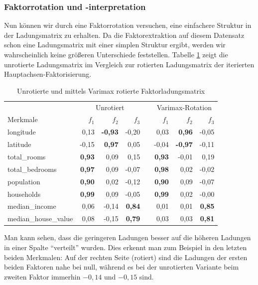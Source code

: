 \documentclass[11pt]{scrartcl}
\begin{document}
	\subsubsection*{Faktorrotation und -interpretation}
	
	Nun können wir durch eine Faktorrotation versuchen, eine einfachere Struktur in der Ladungsmatrix zu erhalten. Da die Faktorextraktion
	auf diesem Datensatz schon eine Ladungsmatrix mit einer simplen Struktur ergibt, werden wir wahrscheinlich keine größeren Unterschiede feststellen.
	Tabelle \ref{tab:rotierte-unrotierte-Ladungen} zeigt die unrotierte Ladungsmatrix im Vergleich zur rotierten Ladungsmatrix
	der iterierten Hauptachsen-Faktorisierung.
	\begin{table}[h]
		\centering
		\begin{tabular}{@{}lrrr c rrr@{}}
			\toprule
			& \multicolumn{3}{c}{Unrotiert} && \multicolumn{3}{c}{Varimax-Rotation} \\
			\cmidrule(lr){2-4} \cmidrule(lr){6-8}
			Merkmale & $f_1$ & $f_2$ & $f_3$ && $f_1$ & $f_2$ & $f_3$ \\ \midrule
			longitude & 0,13     & \textbf{-0,93}    & -0,20   && 0,03   & \textbf{0,96}       & -0,05      \\ \addlinespace[1.3pt]
			latitude  & -0,15    & \textbf{0,97}     & 0,05    && -0,04      & \textbf{-0,97}      & -0,11      \\ \addlinespace[1.3pt]
			total\_rooms         & \textbf{0,93}     & 0,09     & 0,15    &&\textbf{ 0,93}       & -0,01      & 0,19       \\ \addlinespace[1.3pt]
			total\_bedrooms         & \textbf{0,97}     & 0,09     & -0,07   && \textbf{0,98}       & 0,02       & -0,02      \\ \addlinespace[1.3pt]
			population          & \textbf{0,90}     & 0,02     & -0,12   && \textbf{0,90}       & 0,09       & -0,07      \\ \addlinespace[1.3pt]
			households         & \textbf{0,99}     & 0,09     & -0,05   && \textbf{0,99}       & 0,02       & -0,00      \\ \addlinespace[1.3pt]
			median\_income        & 0,06     & -0,14    & \textbf{0,84}    && 0,01       & 0,01       & \textbf{0,85}       \\ \addlinespace[1.3pt]
			median\_house\_value          & 0,08     & -0,15    & \textbf{0,79}    && 0,03       & 0,03       & \textbf{0,81}       \\ \bottomrule
		\end{tabular}
		\caption{Unrotierte und mittels Varimax rotierte Faktorladungsmatrix}
		\label{tab:rotierte-unrotierte-Ladungen}
	\end{table}
	Man kann sehen, dass die geringeren Ladungen besser auf die höheren Ladungen in einer Spalte \enquote{verteilt} wurden. Dies erkennt man zum Beispiel in den letzten beiden Merkmalen: Auf der rechten Seite (rotiert) sind die Ladungen der ersten beiden Faktoren nahe bei null, während es bei der unrotierten Variante beim zweiten Faktor immerhin $-0{,}14$ und $-0{,}15$ sind.
	
\end{document}
